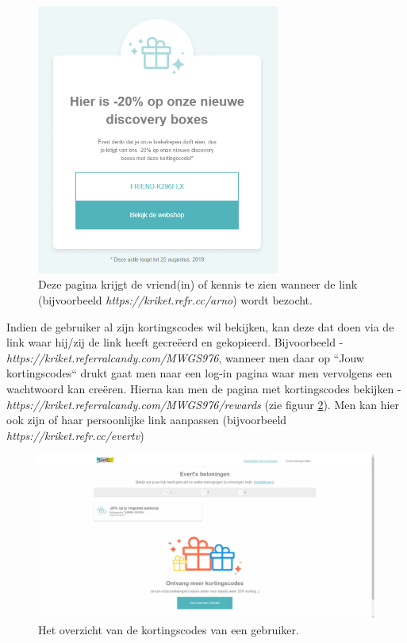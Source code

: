 \begin{figure}[h!]
	\includegraphics[width=80mm,scale=0.7]{img/referral-share-page.png}
	\centering
	\caption{Deze pagina krijgt de vriend(in) of kennis te zien wanneer de link (bijvoorbeeld \emph{https://kriket.refr.cc/arno}) wordt bezocht.}
	\label{fig:referral-share-page}
\end{figure}

Indien de gebruiker al zijn kortingscodes wil bekijken, kan deze dat doen via de link waar hij/zij de link heeft gecreëerd en gekopieerd. Bijvoorbeeld - \emph{https://kriket.referralcandy.com/MWGS976}, wanneer men daar op ``Jouw kortingscodes`` drukt gaat men naar een log-in pagina waar men vervolgens een wachtwoord kan creëren. Hierna kan men de pagina met kortingscodes bekijken - \emph{https://kriket.referralcandy.com/MWGS976/rewards} (zie figuur \ref{fig:referral-account.png}). Men kan hier ook zijn of haar persoonlijke link aanpassen (bijvoorbeeld \emph{https://kriket.refr.cc/evertv})

\begin{figure}[h!]
	\includegraphics[width=\linewidth]{img/referral-account.png}
	\caption{Het overzicht van de kortingscodes van een gebruiker.}
	\label{fig:referral-account.png}
\end{figure}

